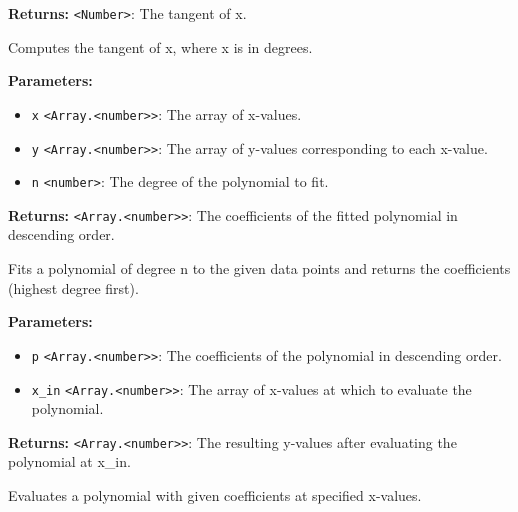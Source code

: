 \documentclass[12pt,a4paper]{article}
\begin{document}
\noindent \textbf{Returns:} \texttt{<Number>}: The tangent of x.

\noindent Computes the tangent of x, where x is in degrees.

\vspace{5mm}
\noindent {}


\noindent \textbf{Parameters:}
\begin{itemize}
  \item \texttt{x} \texttt{<Array.<number>>}: The array of x-values.
  \item \texttt{y} \texttt{<Array.<number>>}: The array of y-values corresponding to each x-value.
  \item \texttt{n} \texttt{<number>}: The degree of the polynomial to fit.
\end{itemize}

\noindent \textbf{Returns:} \texttt{<Array.<number>>}: The coefficients of the fitted polynomial in descending order.

\noindent Fits a polynomial of degree n to the given data points and returns the coefficients (highest degree first).

\vspace{5mm}
\noindent {}


\noindent \textbf{Parameters:}
\begin{itemize}
  \item \texttt{p} \texttt{<Array.<number>>}: The coefficients of the polynomial in descending order.
  \item \texttt{x\_in} \texttt{<Array.<number>>}: The array of x-values at which to evaluate the polynomial.
\end{itemize}

\noindent \textbf{Returns:} \texttt{<Array.<number>>}: The resulting y-values after evaluating the polynomial at x\_in.

\noindent Evaluates a polynomial with given coefficients at specified x-values.

\vspace{5mm}
\noindent {}
\end{document}
